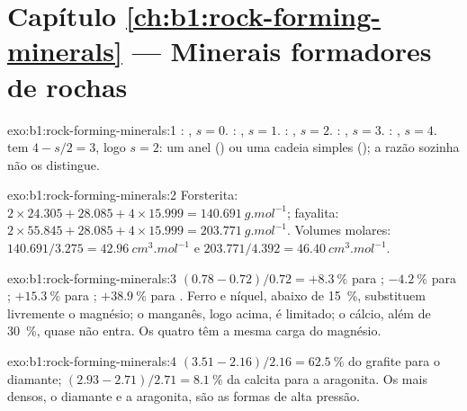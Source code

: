 \section*{Capítulo \ref{ch:b1:rock-forming-minerals} --- Minerais formadores de rochas}

\begin{solution}{exo:b1:rock-forming-minerals:1}
: , $s = 0$. : ,
$s = 1$. : , $s = 2$. :
, $s = 3$. : , $s = 4$. 
tem $4 - s/2 = 3$, logo $s = 2$: um anel () ou uma cadeia simples
(); a razão sozinha não os distingue.
\end{solution}

\begin{solution}{exo:b1:rock-forming-minerals:2}
Forsterita: $2\times24.305 + 28.085 + 4\times15.999 =
\qty{140.691}{g.mol^{-1}}$; fayalita: $2\times55.845 + 28.085 +
4\times15.999 = \qty{203.771}{g.mol^{-1}}$. Volumes molares:
$140.691/3.275 = \qty{42.96}{cm^3.mol^{-1}}$ e $203.771/4.392 =
\qty{46.40}{cm^3.mol^{-1}}$.
\end{solution}

\begin{solution}{exo:b1:rock-forming-minerals:3}
$(0.78 - 0.72)/0.72 = +\qty{8.3}{\percent}$ para ;
$-\qty{4.2}{\percent}$ para ; $+\qty{15.3}{\percent}$ para
; $+\qty{38.9}{\percent}$ para . Ferro e níquel,
abaixo de \qty{15}{\percent}, substituem livremente o magnésio; o manganês, logo acima, é limitado; o cálcio, além de \qty{30}{\percent}, quase não entra. Os quatro têm a mesma carga do magnésio.
\end{solution}

\begin{solution}{exo:b1:rock-forming-minerals:4}
$(3.51 - 2.16)/2.16 = \qty{62.5}{\percent}$ do grafite para o diamante;
$(2.93 - 2.71)/2.71 = \qty{8.1}{\percent}$ da calcita para a aragonita. Os  mais densos, o diamante e a aragonita, são as formas de alta pressão.
\end{solution}

